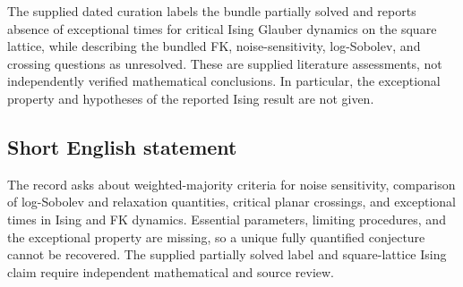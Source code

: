 \documentclass[11pt]{article}
\begin{document}
The supplied dated curation labels the bundle partially solved and reports absence of exceptional times for critical Ising Glauber dynamics on the square lattice, while describing the bundled FK, noise-sensitivity, log-Sobolev, and crossing questions as unresolved. These are supplied literature assessments, not independently verified mathematical conclusions. In particular, the exceptional property and hypotheses of the reported Ising result are not given.
\subsection{Short English statement}
The record asks about weighted-majority criteria for noise sensitivity, comparison of log-Sobolev and relaxation quantities, critical planar crossings, and exceptional times in Ising and FK dynamics. Essential parameters, limiting procedures, and the exceptional property are missing, so a unique fully quantified conjecture cannot be recovered. The supplied partially solved label and square-lattice Ising claim require independent mathematical and source review.
\end{document}

